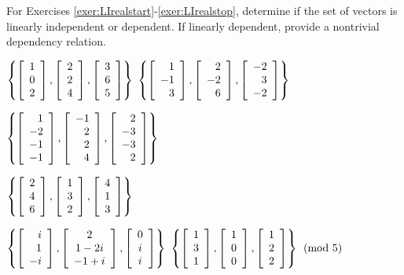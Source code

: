 \noindent For Exercises \ref{exer:LIrealstart}-\ref{exer:LIrealstop}, determine if the set of vectors is linearly independent or dependent. If linearly dependent, provide a nontrivial dependency relation. 
\begin{enumerate}[!HW!]
\begin{multicols}{2}
\item\label{exer:LIrealstart} $\left\{\vr{1\\0\\2},\vr{2\\2\\4},\vr{3\\6\\5}\right\}$ %
\itemspade $\left\{\vr{1\\-1\\3},\vr{2\\-2\\6},\vr{-2\\3\\-2}\right\}$
\end{multicols}
\begin{multicols}{2}
\itemspade $\left\{\vr{1\\-2\\-1\\-1}, \vr{-1\\2\\2\\4}, \vr{2\\-3\\-3\\2}\right\}$
\item $\left\{\vr{2\\4\\6},\vr{1\\3\\2},\vr{4\\1\\3}\right\}$ %
\end{multicols}
\begin{multicols}{2}
\itemspade $\left\{\mtx{r}{i\\1\\-i}, \mtx{c}{2\\1-2i\\-1+i}, \mtx{c}{0\\i\\i}\right\}$
\itemspade $\left\{\vr{1\\3\\1}, \vr{1\\0\\0},\vr{1\\2\\2}\right\} \pmod 5$
\end{multicols}
\end{enumerate}
